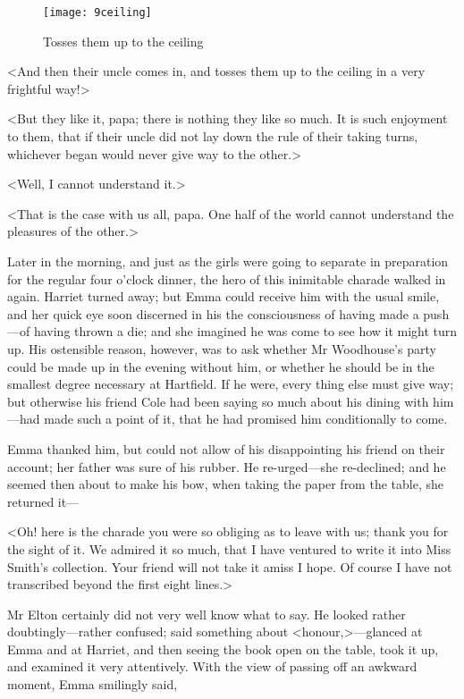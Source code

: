 \begin{figure}[tbph]
\centering
\texttt{[image: 9ceiling]}
\caption{Tosses them up to the ceiling}
\end{figure}

<And then their uncle comes in, and tosses them up to the ceiling in a very frightful way!>

<But they like it, papa; there is nothing they like so much. It is such enjoyment to them, that if their uncle did not lay down the rule of their taking turns, whichever began would never give way to the other.>

<Well, I cannot understand it.>

<That is the case with us all, papa. One half of the world cannot understand the pleasures of the other.>

Later in the morning, and just as the girls were going to separate in preparation for the regular four o'clock dinner, the hero of this inimitable charade walked in again. Harriet turned away; but Emma could receive him with the usual smile, and her quick eye soon discerned in his the consciousness of having made a push—of having thrown a die; and she imagined he was come to see how it might turn up. His ostensible reason, however, was to ask whether Mr Woodhouse's party could be made up in the evening without him, or whether he should be in the smallest degree necessary at Hartfield. If he were, every thing else must give way; but otherwise his friend Cole had been saying so much about his dining with him—had made such a point of it, that he had promised him conditionally to come.

Emma thanked him, but could not allow of his disappointing his friend on their account; her father was sure of his rubber. He re-urged—she re-declined; and he seemed then about to make his bow, when taking the paper from the table, she returned it—

<Oh! here is the charade you were so obliging as to leave with us; thank you for the sight of it. We admired it so much, that I have ventured to write it into Miss Smith's collection. Your friend will not take it amiss I hope. Of course I have not transcribed beyond the first eight lines.>

Mr Elton certainly did not very well know what to say. He looked rather doubtingly—rather confused; said something about <honour,>—glanced at Emma and at Harriet, and then seeing the book open on the table, took it up, and examined it very attentively. With the view of passing off an awkward moment, Emma smilingly said,

